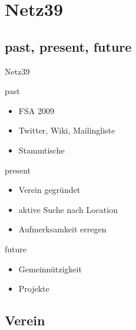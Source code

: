 \documentclass[hyperref={pdfpagelabels=false}]{beamer}
\begin{document}
\section{Netz39}

\subsection{past, present, future}

\begin{frame}{Netz39}
    \begin{block}{past}
        \begin{itemize}
            \item FSA 2009
            \item Twitter, Wiki, Mailingliste
            \item Stammtische
        \end{itemize}
    \end{block}
    \pause
    \begin{block}{present}
        \begin{itemize}
            \item Verein gegründet
            \item aktive Suche nach Location
            \item Aufmerksamkeit erregen
        \end{itemize}
    \end{block}
    \pause
    \begin{block}{future}
        \begin{itemize}
            \item Gemeinnützigkeit
            \item Projekte
        \end{itemize}
    \end{block}
\end{frame}

\subsection{Verein}
\end{document}
